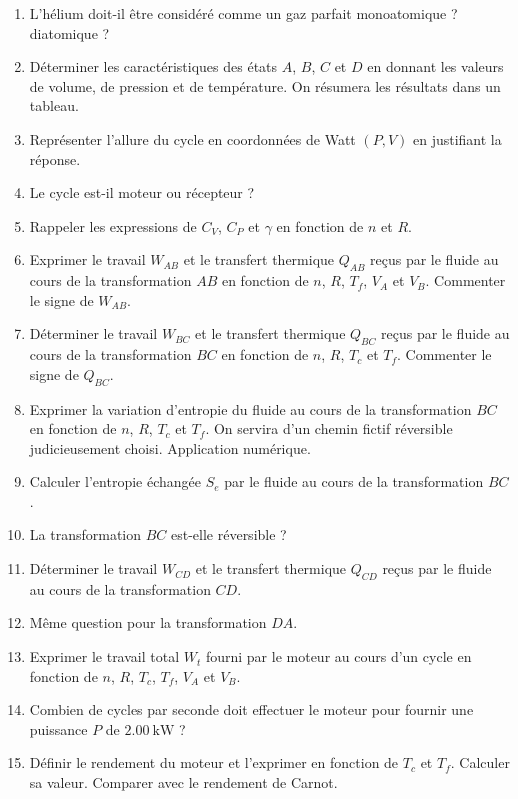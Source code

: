 \begin{enumerate}
	\item L'hélium doit-il être considéré comme un gaz parfait monoatomique ? diatomique ?
	\item Déterminer les caractéristiques des états $A$, $B$, $C$ et $D$ en donnant les valeurs de volume, de pression et de température. On résumera les résultats dans un tableau.
	\item Représenter l'allure du cycle en coordonnées de Watt $(P, V)$ en justifiant la réponse.
	\item Le cycle est-il moteur ou récepteur ?
	\item Rappeler les expressions de $C_V$, $C_P$ et $\gamma$ en fonction de $n$ et $R$.
	\item Exprimer le travail $W_{AB}$ et le transfert thermique $Q_{AB}$ reçus par le fluide au cours de la transformation $AB$ en fonction de $n$, $R$, $T_f$, $V_A$ et $V_B$. Commenter le signe de $W_{AB}$.
	\item Déterminer le travail $W_{BC}$ et le transfert thermique $Q_{BC}$ reçus par le fluide au cours de la transformation $BC$ en fonction de $n$, $R$, $T_c$ et $T_f$. Commenter le signe de $Q_{BC}$.
	\item Exprimer la variation d'entropie du fluide au cours de la transformation $BC$ en fonction de $n$, $R$, $T_c$ et $T_f$. On servira d'un chemin fictif réversible judicieusement choisi. Application numérique.
	\item Calculer l'entropie échangée $S_e$ par le fluide au cours de la transformation $BC$. 
	\item La transformation $BC$ est-elle réversible ?
	\item Déterminer le travail $W_{CD}$ et le transfert thermique $Q_{CD}$ reçus par le fluide au cours de la transformation $CD$.
	\item Même question pour la transformation $DA$.
	\item Exprimer le travail total $W_t$ fourni par le moteur au cours d'un cycle en fonction de $n$, $R$, $T_c$, $T_f$, $V_A$ et $V_B$.
	\item Combien de cycles par seconde doit effectuer le moteur pour fournir une puissance $P$ de $\SI{2.00}{\kilo\watt}$ ?
	\item Définir le rendement du moteur et l'exprimer en fonction de $T_c$ et $T_f$. Calculer sa valeur. Comparer avec le rendement de Carnot.
\end{enumerate}

